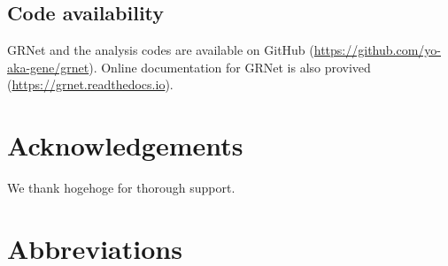 \documentclass{article}
\begin{document}
\subsection*{Code availability}
GRNet and the analysis codes are available on GitHub (\url{https://github.com/yo-aka-gene/grnet}).
Online documentation for GRNet is also provived (\url{https://grnet.readthedocs.io}).



\section*{Acknowledgements}
We thank hogehoge for thorough support.


\section*{Abbreviations}
\printacronyms[heading=Abbreviations]



\end{document}
